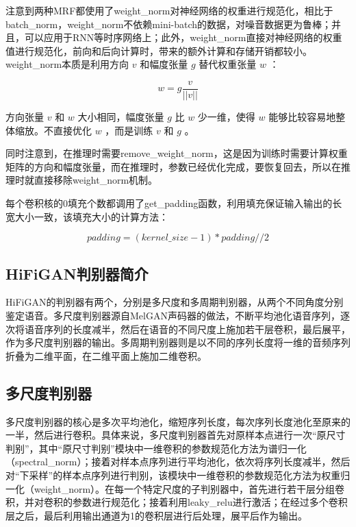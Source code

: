 \documentclass[cn,10pt,math=newtx,citestyle=gb7714-2015,bibstyle=gb7714-2015]{elegantbook}
\begin{document}
注意到两种MRF都使用了weight\_norm对神经网络的权重进行规范化，相比于batch\_norm，weight\_norm不依赖mini-batch的数据，对噪音数据更为鲁棒；并且，可以应用于RNN等时序网络上；此外，weight\_norm直接对神经网络的权重值进行规范化，前向和后向计算时，带来的额外计算和存储开销都较小。weight\_norm本质是利用方向 $v$ 和幅度张量 $g$ 替代权重张量 $w$ ：

\begin{equation}
  w=g\frac{v}{||v||}
\end{equation}

方向张量 $v$ 和 $w$ 大小相同，幅度张量 $g$ 比 $w$ 少一维，使得 $w$ 能够比较容易地整体缩放。不直接优化 $w$ ，而是训练 $v$ 和 $g$ 。

同时注意到，在推理时需要remove\_weight\_norm，这是因为训练时需要计算权重矩阵的方向和幅度张量，而在推理时，参数已经优化完成，要恢复回去，所以在推理时就直接移除weight\_norm机制。

每个卷积核的0填充个数都调用了get\_padding函数，利用填充保证输入输出的长宽大小一致，该填充大小的计算方法：

\begin{equation}
  padding=(kernel\_size-1)*padding//2
\end{equation}

\subsection{HiFiGAN判别器简介}

HiFiGAN的判别器有两个，分别是多尺度和多周期判别器，从两个不同角度分别鉴定语音。多尺度判别器源自MelGAN声码器的做法，不断平均池化语音序列，逐次将语音序列的长度减半，然后在语音的不同尺度上施加若干层卷积，最后展平，作为多尺度判别器的输出。多周期判别器则是以不同的序列长度将一维的音频序列折叠为二维平面，在二维平面上施加二维卷积。

\subsection{多尺度判别器}

多尺度判别器的核心是多次平均池化，缩短序列长度，每次序列长度池化至原来的一半，然后进行卷积。具体来说，多尺度判别器首先对原样本点进行一次“原尺寸判别”，其中“原尺寸判别”模块中一维卷积的参数规范化方法为谱归一化（spectral\_norm）；接着对样本点序列进行平均池化，依次将序列长度减半，然后对“下采样”的样本点序列进行判别，该模块中一维卷积的参数规范化方法为权重归一化（weight\_norm）。在每一个特定尺度的子判别器中，首先进行若干层分组卷积，并对卷积的参数进行规范化；接着利用leaky\_relu进行激活；在经过多个卷积层之后，最后利用输出通道为1的卷积层进行后处理，展平后作为输出。
\end{document}
